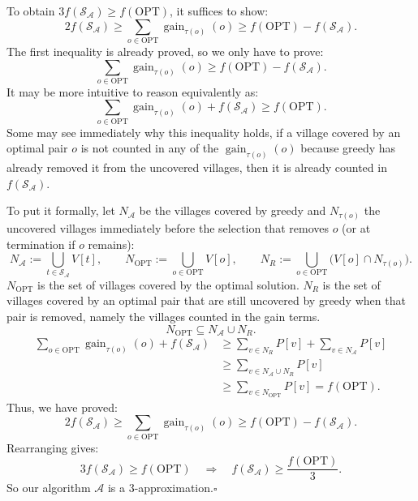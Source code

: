 \documentclass[12pt,a4paper]{article}
\begin{document}
\begin{enumerate}
To obtain $3f(\mathcal{S}_{\mathcal{A}})\geq f(\mathrm{OPT})$, it suffices to show:
\[
2f(\mathcal{S}_{\mathcal{A}})
\geq\sum_{o\in\mathrm{OPT}}\operatorname{gain}_{\tau(o)}(o)
\geq f(\mathrm{OPT})-f(\mathcal{S}_{\mathcal{A}}).
\]
The first inequality is already proved, so we only have to prove:
\[
\sum_{o\in\mathrm{OPT}}\operatorname{gain}_{\tau(o)}(o)
\geq f(\mathrm{OPT})-f(\mathcal{S}_{\mathcal{A}}).
\]
It may be more intuitive to reason equivalently as:
\[
\sum_{o\in\mathrm{OPT}}\operatorname{gain}_{\tau(o)}(o)
+f(\mathcal{S}_{\mathcal{A}})\geq f(\mathrm{OPT}).
\]
Some may see immediately why this inequality holds, if a village covered by
an optimal pair $o$ is not counted in any of the $\operatorname{gain}_{\tau(o)}(o)$ because
greedy has already removed it from the uncovered villages, then it is already
counted in $f(\mathcal{S}_{\mathcal{A}})$.

To put it formally, let $N_{\mathcal{A}}$ be the villages covered by greedy and
$N_{\tau(o)}$ the uncovered villages immediately before the selection that
removes $o$ (or at termination if $o$ remains):
\[
N_{\mathcal{A}}:=\bigcup_{t\in\mathcal{S}_{\mathcal{A}}}V[t],\qquad
N_{\mathrm{OPT}}:=\bigcup_{o\in\mathrm{OPT}}V[o],\qquad
N_R:=\bigcup_{o\in\mathrm{OPT}}\bigl(V[o]\cap N_{\tau(o)}\bigr).
\]
$N_{\mathrm{OPT}}$ is the set of villages covered by the optimal solution.
$N_R$ is the set of villages covered by an optimal pair that are still uncovered
by greedy when that pair is removed, namely the villages counted in the gain terms.
\[
N_{\mathrm{OPT}}\subseteq N_{\mathcal{A}}\cup N_R.
\]
\[
\begin{aligned}
\sum_{o\in\mathrm{OPT}}\operatorname{gain}_{\tau(o)}(o)
+f(\mathcal{S}_{\mathcal{A}})
&\geq\sum_{v\in N_R}P[v]+\sum_{v\in N_{\mathcal{A}}}P[v]\\
&\geq\sum_{v\in N_{\mathcal{A}}\cup N_R}P[v]\\
&\geq\sum_{v\in N_{\mathrm{OPT}}}P[v]
=f(\mathrm{OPT}).
\end{aligned}
\]
Thus, we have proved:
\[
2f(\mathcal{S}_{\mathcal{A}})
\geq\sum_{o\in\mathrm{OPT}}\operatorname{gain}_{\tau(o)}(o)
\geq f(\mathrm{OPT})-f(\mathcal{S}_{\mathcal{A}}).
\]
Rearranging gives:
\[
3f(\mathcal{S}_{\mathcal{A}})\geq f(\mathrm{OPT})
\quad\Longrightarrow\quad
f(\mathcal{S}_{\mathcal{A}})\geq\frac{f(\mathrm{OPT})}{3}.
\]
So our algorithm $\mathcal{A}$ is a $3$-approximation.\hfill$\square$
\end{enumerate}
\end{document}

